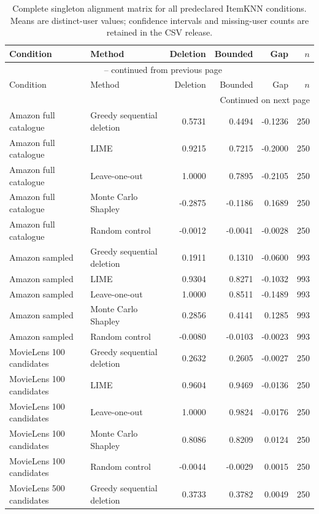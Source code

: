 \begin{longtable}{@{}p{.24\linewidth}p{.17\linewidth}rrrr@{}}
\caption{Complete singleton alignment matrix for all predeclared ItemKNN conditions. Means are distinct-user values; confidence intervals and missing-user counts are retained in the CSV release.}\label{tab:S1}\\
\toprule
Condition & Method & Deletion & Bounded & Gap & $n$ \\
\midrule
\endfirsthead
\multicolumn{6}{c}{\tablename\ \thetable{} -- continued from previous page}\\
\toprule
Condition & Method & Deletion & Bounded & Gap & $n$ \\
\midrule
\endhead
\midrule
\multicolumn{6}{r}{Continued on next page}\\
\endfoot
\bottomrule
\endlastfoot
Amazon full catalogue & Greedy sequential deletion & 0.5731 & 0.4494 & -0.1236 & 250 \\
Amazon full catalogue & LIME & 0.9215 & 0.7215 & -0.2000 & 250 \\
Amazon full catalogue & Leave-one-out & 1.0000 & 0.7895 & -0.2105 & 250 \\
Amazon full catalogue & Monte Carlo Shapley & -0.2875 & -0.1186 & 0.1689 & 250 \\
Amazon full catalogue & Random control & -0.0012 & -0.0041 & -0.0028 & 250 \\
Amazon sampled & Greedy sequential deletion & 0.1911 & 0.1310 & -0.0600 & 993 \\
Amazon sampled & LIME & 0.9304 & 0.8271 & -0.1032 & 993 \\
Amazon sampled & Leave-one-out & 1.0000 & 0.8511 & -0.1489 & 993 \\
Amazon sampled & Monte Carlo Shapley & 0.2856 & 0.4141 & 0.1285 & 993 \\
Amazon sampled & Random control & -0.0080 & -0.0103 & -0.0023 & 993 \\
MovieLens 100 candidates & Greedy sequential deletion & 0.2632 & 0.2605 & -0.0027 & 250 \\
MovieLens 100 candidates & LIME & 0.9604 & 0.9469 & -0.0136 & 250 \\
MovieLens 100 candidates & Leave-one-out & 1.0000 & 0.9824 & -0.0176 & 250 \\
MovieLens 100 candidates & Monte Carlo Shapley & 0.8086 & 0.8209 & 0.0124 & 250 \\
MovieLens 100 candidates & Random control & -0.0044 & -0.0029 & 0.0015 & 250 \\
MovieLens 500 candidates & Greedy sequential deletion & 0.3733 & 0.3782 & 0.0049 & 250 \\

\end{longtable}
